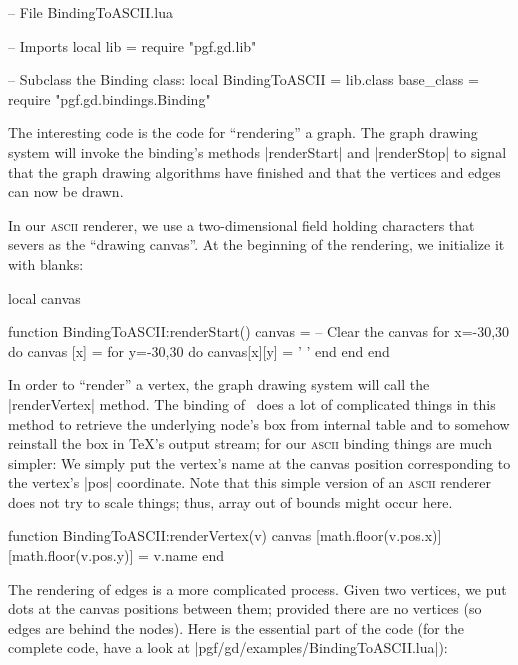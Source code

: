 \begin{codeexample}
-- File BindingToASCII.lua

-- Imports
local lib = require "pgf.gd.lib"

-- Subclass the Binding class:
local BindingToASCII = lib.class { base_class = require "pgf.gd.bindings.Binding" }
\end{codeexample}

The interesting code is the code for
``rendering'' a graph. The graph drawing system will invoke the
binding's methods |renderStart| and |renderStop| to signal that the
graph drawing algorithms have finished and that the vertices and edges
can now be drawn.

In our \textsc{ascii} renderer, we use a two-dimensional field holding 
characters that severs as the ``drawing canvas''. At the beginning of
the rendering, we initialize it with blanks:

\begin{codeexample}
local canvas
  
function BindingToASCII:renderStart()
  canvas = {}
  -- Clear the canvas
  for x=-30,30 do
    canvas [x] = {}
    for y=-30,30 do
      canvas[x][y] = ' '
    end
  end
end
\end{codeexample}

In order to ``render'' a vertex, the graph drawing system will call
the |renderVertex| method. The binding of \tikzname\ does a lot of
complicated things in this method to retrieve the underlying node's
box from internal table and to somehow reinstall the box in \TeX's
output stream; for our \textsc{ascii} binding things are much simpler:
We simply put the vertex's name at the canvas position corresponding
to the vertex's |pos| coordinate. Note that this simple version of an
\textsc{ascii} renderer does not try to scale things; thus, array out
of bounds might occur here.

\begin{codeexample}
function BindingToASCII:renderVertex(v)
  canvas [math.floor(v.pos.x)][math.floor(v.pos.y)] = v.name
end
\end{codeexample}

The rendering of edges is a more complicated process. Given two
vertices, we put dots at the canvas positions between them; provided
there are no vertices (so edges are behind the nodes). Here is the
essential part of the code (for the complete code, have a look at
|pgf/gd/examples/BindingToASCII.lua|):



